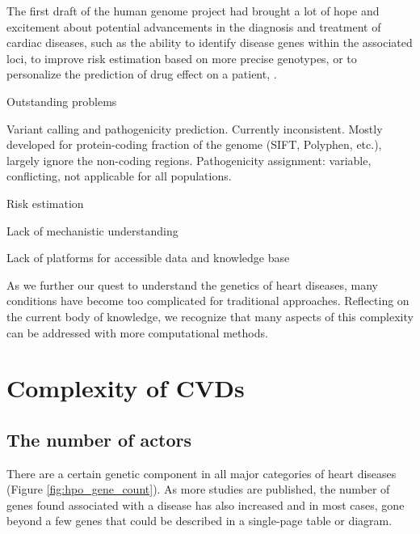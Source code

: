 \documentclass[letter]{bioinfo}
\begin{document}
The first draft of the human genome project had brought a lot of hope and excitement about potential advancements in the diagnosis and treatment of cardiac diseases, such as the ability to identify disease genes within the associated loci, to improve risk estimation based on more precise genotypes, or to personalize the prediction of drug effect on a patient, \citep{Komajda:2001:heart}.


Outstanding problems

Variant calling and pathogenicity prediction. Currently inconsistent. Mostly developed for protein-coding fraction of the genome (SIFT, Polyphen, etc.), largely ignore the non-coding regions.
Pathogenicity assignment: variable, conflicting, not applicable for all populations.

Risk estimation

Lack of mechanistic understanding

Lack of platforms for accessible data and knowledge base


As we further our quest to understand the genetics of heart diseases, many conditions have become too complicated for traditional approaches. Reflecting on the current body of knowledge, we recognize that many aspects of this complexity can be addressed with more computational methods.



\section{Complexity of CVDs}  %

\subsection{The number of actors}

% 
There are a certain genetic component in all major categories of heart diseases (Figure \ref{fig:hpo_gene_count}). As more studies are published, the number of genes found associated with a disease has also increased and in most cases, gone beyond a few genes that could be described in a single-page table or diagram.
\end{document}
